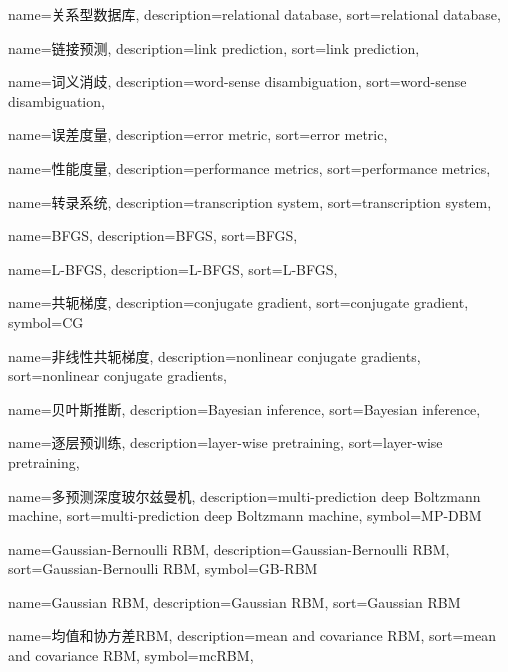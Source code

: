 {
  name=关系型数据库,
  description={relational database},
  sort={relational database},
}

{
  name=链接预测,
  description={link prediction},
  sort={link prediction},
}

{
  name=词义消歧,
  description={word-sense disambiguation},
  sort={word-sense disambiguation},
}

{
  name=误差度量,
  description={error metric},
  sort={error metric},
}

{
  name=性能度量,
  description={performance metrics},
  sort={performance metrics},
}

{
  name=转录系统,
  description={transcription system},
  sort={transcription system},
}

{
  name=BFGS,
  description={BFGS},
  sort={BFGS},
}

{
  name=L-BFGS,
  description={L-BFGS},
  sort={L-BFGS},
}

{
  name=共轭梯度,
  description={conjugate gradient},
  sort={conjugate gradient},
  symbol={CG}
}

{
  name=非线性共轭梯度,
  description={nonlinear conjugate gradients},
  sort={nonlinear conjugate gradients},
}

{
  name=贝叶斯推断,
  description={Bayesian inference},
  sort={Bayesian inference},
}

{
  name=逐层预训练,
  description={layer-wise pretraining},
  sort={layer-wise pretraining},
}

{
  name=多预测深度玻尔兹曼机,
  description={multi-prediction deep Boltzmann machine},
  sort={multi-prediction deep Boltzmann machine},
  symbol={MP-DBM}
}

{
  name=Gaussian-Bernoulli RBM,
  description={Gaussian-Bernoulli RBM},
  sort={Gaussian-Bernoulli RBM},
  symbol={GB-RBM}
}

{
  name=Gaussian RBM,
  description={Gaussian RBM},
  sort={Gaussian RBM}
}

{
  name=均值和协方差RBM,
  description={mean and covariance RBM},
  sort={mean and covariance RBM},
  symbol={mcRBM},
}

